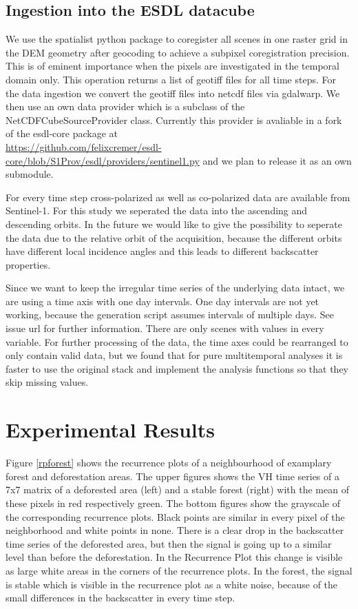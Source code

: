 \documentclass{article}
\begin{document}
\subsection{Ingestion into the ESDL datacube}
We use the spatialist python package \cite{spatialist} to coregister all scenes in one raster grid in the DEM geometry after geocoding to achieve a subpixel coregistration precision.
This is of eminent importance when the pixels are investigated in the temporal domain only.
This operation returns a list of geotiff files for all time steps.
For the data ingestion we convert the geotiff files into netcdf files via gdalwarp.
We then use an own data provider which is a subclass of the NetCDFCubeSourceProvider class.
Currently this provider is avaliable in a fork of the esdl-core package at \\
\url{https://github.com/felixcremer/esdl-core/blob/S1Prov/esdl/providers/sentinel1.py}
and we plan to release it as an own submodule.

For every time step cross-polarized as well as co-polarized data are available from Sentinel-1.
For this study we seperated the data into the ascending and descending orbits.
In the future we would like to give the possibility to seperate the data due to the relative orbit of the acquisition,
because the different orbits have different local incidence angles and this leads to different backscatter properties.

Since we want to keep the irregular time series of the underlying data intact, we are using a time axis with one day intervals.
One day intervals are not yet working, because the generation script assumes intervals of multiple days.
See issue url for further information.
There are only scenes with values in every variable.
For further processing of the data, the time axes could be rearranged to only contain valid data,
but we found that for pure multitemporal analyses it is faster to use the original stack and implement the analysis functions so that they skip missing values. 




\section{Experimental Results}

Figure \ref{rpforest} shows the recurrence plots of a neighbourhood of examplary forest and deforestation areas.
The upper figures shows the VH time series of a 7x7 matrix of a deforested area (left) and a stable forest (right) with the mean of these pixels in red respectively green.
The bottom figures show the grayscale of the corresponding recurrence plots.
Black points are similar in every pixel of the neighborhood and white points in none.
There is a clear drop in the backscatter time series of the deforested area, but then the signal is going up to a similar level than before the deforestation.
In the Recurrence Plot this change is visible as large white areas in the corners of the recurrence plots. 
In the forest, the signal is stable which is visible in the recurrence plot as a white noise, because of the small differences in the backscatter in every time step.
\end{document}

